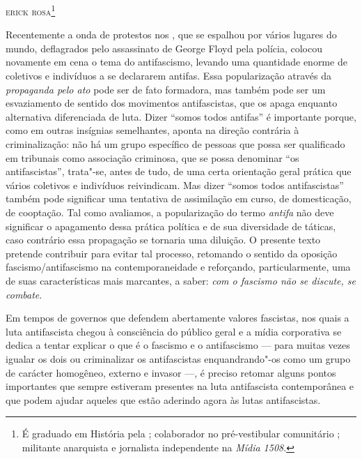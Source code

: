 \hfill{}\textsc{erick rosa}\footnote[\ddag]{É graduado em História pela ; colaborador no
  pré-vestibular comunitário ; militante anarquista e jornalista independente na \emph{Mídia 1508}.}

\bigskip

Recentemente a onda de protestos nos , que se espalhou por vários
lugares do mundo, deflagrados pelo assassinato de George Floyd pela
polícia, colocou novamente em cena o tema do antifascismo, levando uma quantidade enorme de coletivos e indivíduos a se declararem
antifas. Essa popularização através da \emph{propaganda pelo ato}
pode ser de fato formadora, mas também pode ser um esvaziamento de
sentido dos movimentos antifascistas, que os apaga enquanto alternativa
diferenciada de luta. Dizer ``somos todos antifas'' é
importante porque, como em outras insígnias semelhantes, aponta na
direção contrária à criminalização: não há um grupo específico de
pessoas que possa ser qualificado em tribunais como associação
criminosa, que se possa denominar ``os antifascistas'', trata"-se, antes de
tudo, de uma certa orientação geral prática que vários coletivos e
indivíduos reivindicam. Mas dizer ``somos todos antifascistas'' também
pode significar uma tentativa de assimilação em curso, de domesticação,
de cooptação. Tal como avaliamos, a popularização do termo \emph{antifa}
não deve significar o apagamento dessa prática política e de sua
diversidade de táticas, caso contrário essa propagação se
tornaria uma diluição. O presente texto pretende contribuir para evitar
tal processo, retomando o sentido da oposição fascismo/antifascismo na
contemporaneidade e reforçando, particularmente, uma de suas
características mais marcantes, a saber: \emph{com o fascismo não se
discute, se combate}.

Em tempos de governos que defendem abertamente valores fascistas, nos quais a
luta antifascista chegou à consciência do público geral e a mídia
corporativa se dedica a tentar explicar o que é o fascismo e o
antifascismo --- para muitas vezes igualar os dois ou criminalizar os
antifascistas enquandrando"-os como um grupo de carácter homogêneo, externo e invasor ---, é preciso retomar alguns pontos importantes que sempre
estiveram presentes na luta antifascista contemporânea e que podem
ajudar aqueles que estão aderindo agora às lutas antifascistas.

